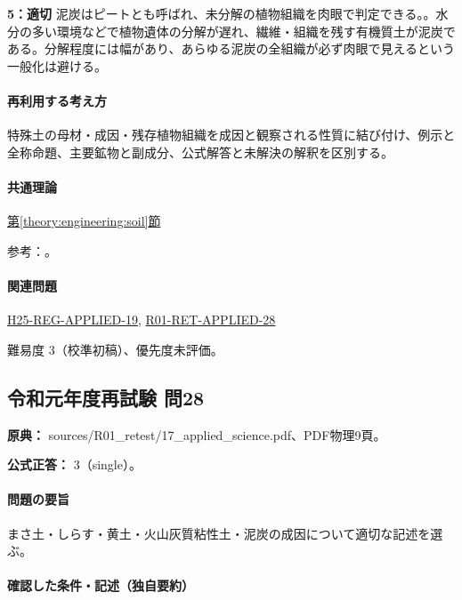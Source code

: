 \noindent\textbf{5：適切} 泥炭はピートとも呼ばれ、未分解の植物組織を肉眼で判定できる。。水分の多い環境などで植物遺体の分解が遅れ、繊維・組織を残す有機質土が泥炭である。分解程度には幅があり、あらゆる泥炭の全組織が必ず肉眼で見えるという一般化は避ける。\par

\paragraph{再利用する考え方} 特殊土の母材・成因・残存植物組織を成因と観察される性質に結び付け、例示と全称命題、主要鉱物と副成分、公式解答と未解決の解釈を区別する。

\paragraph{共通理論} \hyperref[theory:engineering:soil]{第\ref*{theory:engineering:soil}節}

\par 参考：\cite{mlit_masa,maff_shiras2017,mlit_peat,gsj_loess2002}。

\paragraph{関連問題} \hyperref[q:h25-reg-applied-19]{H25-REG-APPLIED-19}, \hyperref[q:r01-ret-applied-28]{R01-RET-APPLIED-28}

\par 難易度 3（校準初稿）、優先度未評価。

\subsection{令和元年度再試験 問28}
\label{q:r01-ret-applied-28}

\noindent\textbf{原典：} sources/R01\_retest/17\_applied\_science.pdf、PDF物理9頁。

\textbf{公式正答：} 3（single）。

\paragraph{問題の要旨} まさ土・しらす・黄土・火山灰質粘性土・泥炭の成因について適切な記述を選ぶ。

\paragraph{確認した条件・記述（独自要約）}\mbox{}\par

